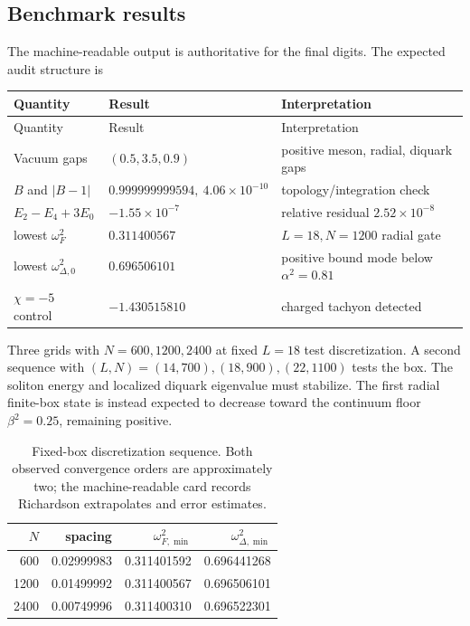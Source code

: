 \documentclass[11pt]{article}
\theoremstyle{definition}
\theoremstyle{remark}
\begin{document}
\subsection{Benchmark results}

The machine-readable output is authoritative for the final digits.  The
expected audit structure is
\begin{longtable}{@{}L{0.38\textwidth}L{0.25\textwidth}L{0.27\textwidth}@{}}
\toprule
Quantity & Result & Interpretation\\
\midrule
\endfirsthead
\toprule
Quantity & Result & Interpretation\\
\midrule
\endhead
Vacuum gaps & \((0.5,3.5,0.9)\) & positive meson, radial, diquark gaps\\
\(B\) and \(|B-1|\) &
\(0.999999999594,\ 4.06\times10^{-10}\) & topology/integration check\\
\(E_2-E_4+3E_0\) &
\(-1.55\times10^{-7}\) & relative residual \(2.52\times10^{-8}\)\\
lowest \(\omega_F^2\) & \(0.311400567\) & \(L=18,N=1200\) radial gate\\
lowest \(\omega_{\Delta,0}^2\) & \(0.696506101\) &
positive bound mode below \(\alpha^2=0.81\)\\
\(\chi=-5\) control & \(-1.430515810\) & charged tachyon detected\\
\bottomrule
\end{longtable}

Three grids with \(N=600,1200,2400\) at fixed \(L=18\) test discretization.
A second sequence with
\((L,N)=(14,700),(18,900),(22,1100)\) tests the box.  The soliton energy and
localized diquark eigenvalue must stabilize.  The first radial finite-box
state is instead expected to decrease toward the continuum floor
\(\beta^2=0.25\), remaining positive.

\begin{table}[htbp]
\centering
\begin{tabular}{@{}rrrr@{}}
\toprule
\(N\) & spacing & \(\omega_{F,\min}^2\) &
\(\omega_{\Delta,\min}^2\)\\
\midrule
600  & 0.02999983 & 0.311401592 & 0.696441268\\
1200 & 0.01499992 & 0.311400567 & 0.696506101\\
2400 & 0.00749996 & 0.311400310 & 0.696522301\\
\bottomrule
\end{tabular}
\caption{Fixed-box discretization sequence.  Both observed convergence orders
are approximately two; the machine-readable card records Richardson
extrapolates and error estimates.}
\label{tab:grid-convergence}
\end{table}
\end{document}
